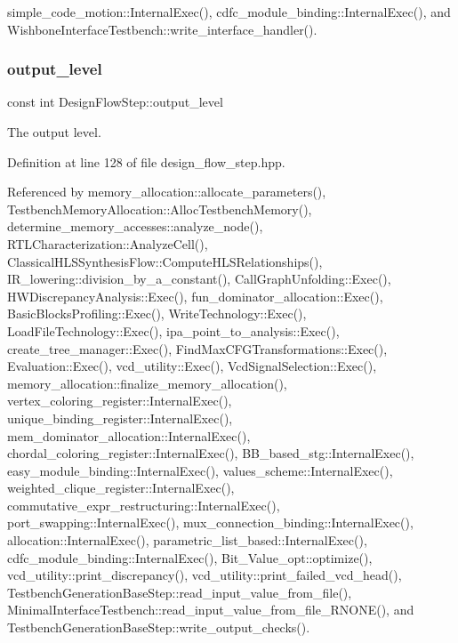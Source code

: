 simple\+\_\+code\+\_\+motion\+::\+Internal\+Exec(), cdfc\+\_\+module\+\_\+binding\+::\+Internal\+Exec(), and Wishbone\+Interface\+Testbench\+::write\+\_\+interface\+\_\+handler().

\mbox{\label{classDesignFlowStep_ad1ca503adaba849037edba18d9f209b8}} 
\subsubsection{\texorpdfstring{output\+\_\+level}{output\_level}}
{\footnotesize\ttfamily const int Design\+Flow\+Step\+::output\+\_\+level\hspace{0.3cm}{\ttfamily [protected]}}



The output level. 



Definition at line 128 of file design\+\_\+flow\+\_\+step.\+hpp.



Referenced by memory\+\_\+allocation\+::allocate\+\_\+parameters(), Testbench\+Memory\+Allocation\+::\+Alloc\+Testbench\+Memory(), determine\+\_\+memory\+\_\+accesses\+::analyze\+\_\+node(), R\+T\+L\+Characterization\+::\+Analyze\+Cell(), Classical\+H\+L\+S\+Synthesis\+Flow\+::\+Compute\+H\+L\+S\+Relationships(), I\+R\+\_\+lowering\+::division\+\_\+by\+\_\+a\+\_\+constant(), Call\+Graph\+Unfolding\+::\+Exec(), H\+W\+Discrepancy\+Analysis\+::\+Exec(), fun\+\_\+dominator\+\_\+allocation\+::\+Exec(), Basic\+Blocks\+Profiling\+::\+Exec(), Write\+Technology\+::\+Exec(), Load\+File\+Technology\+::\+Exec(), ipa\+\_\+point\+\_\+to\+\_\+analysis\+::\+Exec(), create\+\_\+tree\+\_\+manager\+::\+Exec(), Find\+Max\+C\+F\+G\+Transformations\+::\+Exec(), Evaluation\+::\+Exec(), vcd\+\_\+utility\+::\+Exec(), Vcd\+Signal\+Selection\+::\+Exec(), memory\+\_\+allocation\+::finalize\+\_\+memory\+\_\+allocation(), vertex\+\_\+coloring\+\_\+register\+::\+Internal\+Exec(), unique\+\_\+binding\+\_\+register\+::\+Internal\+Exec(), mem\+\_\+dominator\+\_\+allocation\+::\+Internal\+Exec(), chordal\+\_\+coloring\+\_\+register\+::\+Internal\+Exec(), B\+B\+\_\+based\+\_\+stg\+::\+Internal\+Exec(), easy\+\_\+module\+\_\+binding\+::\+Internal\+Exec(), values\+\_\+scheme\+::\+Internal\+Exec(), weighted\+\_\+clique\+\_\+register\+::\+Internal\+Exec(), commutative\+\_\+expr\+\_\+restructuring\+::\+Internal\+Exec(), port\+\_\+swapping\+::\+Internal\+Exec(), mux\+\_\+connection\+\_\+binding\+::\+Internal\+Exec(), allocation\+::\+Internal\+Exec(), parametric\+\_\+list\+\_\+based\+::\+Internal\+Exec(), cdfc\+\_\+module\+\_\+binding\+::\+Internal\+Exec(), Bit\+\_\+\+Value\+\_\+opt\+::optimize(), vcd\+\_\+utility\+::print\+\_\+discrepancy(), vcd\+\_\+utility\+::print\+\_\+failed\+\_\+vcd\+\_\+head(), Testbench\+Generation\+Base\+Step\+::read\+\_\+input\+\_\+value\+\_\+from\+\_\+file(), Minimal\+Interface\+Testbench\+::read\+\_\+input\+\_\+value\+\_\+from\+\_\+file\+\_\+\+R\+N\+O\+N\+E(), and Testbench\+Generation\+Base\+Step\+::write\+\_\+output\+\_\+checks().

